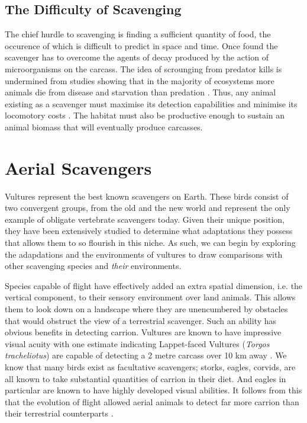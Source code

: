 \documentclass[a4paper,12pt]{article}
\begin{document}
\subsection*{The Difficulty of Scavenging}
The chief hurdle to scavenging is finding a sufficient quantity of food, the occurence of which is difficult to predict in space and time. Once found the scavenger has to overcome the agents of decay produced by the action of microorganisms on the carcass. The idea of scrounging from predator kills is undermined from studies showing that in the  majority of ecosystems more animals die from disease and starvation than predation \citep{benbow2015introduction}. Thus, any animal existing as a scavenger must maximise its detection capabilities and minimise its locomotory costs \citep{ruxton2004obligate}. The habitat must also be productive enough to sustain an animal biomass that will eventually produce carcasses. 

\section*{Aerial Scavengers}

Vultures represent the best known scavengers on Earth. These birds consist of two convergent groups, from the old and the new world and represent the only example of obligate vertebrate scavengers today. Given their unique position, they have been extensively studied to determine what adaptations they possess that allows them to so flourish in this niche. As such, we can begin by exploring the adapdations and the environments of vultures to draw comparisons with other scavenging species and \textit{their} environments. 

Species capable of flight have effectively added an extra spatial dimension, i.e. the vertical component, to their sensory environment over land animals. This allows them to look down on a landscape where they are unencumbered by obstacles that would obstruct the view of a terrestrial scavenger. Such an ability has obvious benefits in detecting carrion. Vultures are known to have impressive visual acuity with one estimate indicating Lappet-faced Vultures (\textit{Torgos tracheliotus}) are capable of detecting a 2 metre carcass over 10 km away \citep{spiegel2013factors}. We know that many birds exist as facultative scavengers; storks, eagles, corvids, are all known to take substantial quantities of carrion in their diet. And eagles in particular are known to have highly developed visual abilities. It follows from this that the evolution of flight allowed aerial animals to detect far more carrion than their terrestrial counterparts \citep{AR:AR22815}.
\end{document}
